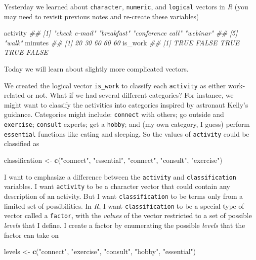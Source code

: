 \documentclass[]{book}
\newenvironment{Shaded}{\begin{snugshade}}{\end{snugshade}}
\newcommand{\CommentTok}[1]{\textcolor[rgb]{0.56,0.35,0.01}{\textit{#1}}}
\newcommand{\KeywordTok}[1]{\textcolor[rgb]{0.13,0.29,0.53}{\textbf{#1}}}
\newcommand{\NormalTok}[1]{#1}
\newcommand{\StringTok}[1]{\textcolor[rgb]{0.31,0.60,0.02}{#1}}
\begin{document}
Yesterday we learned about \texttt{character}, \texttt{numeric}, and \texttt{logical} vectors in \emph{R} (you may need to revisit previous notes and re-create these variables)

\begin{Shaded}
\begin{Highlighting}[]
\NormalTok{activity}
\CommentTok{## [1] "check e-mail"    "breakfast"       "conference call" "webinar"        }
\CommentTok{## [5] "walk"}
\NormalTok{minutes}
\CommentTok{## [1] 20 30 60 60 60}
\NormalTok{is_work}
\CommentTok{## [1]  TRUE FALSE  TRUE  TRUE FALSE}
\end{Highlighting}
\end{Shaded}

Today we will learn about slightly more complicated vectors.

We created the logical vector \texttt{is\_work} to classify each \texttt{activity} as either work-related or not. What if we had several different categories? For instance, we might want to classify the activities into categories inspired by astronaut Kelly's guidance. Categories might include: \texttt{connect} with others; go outside and \texttt{exercise}; \texttt{consult} experts; get a \texttt{hobby}; and (my own category, I guess) perform \texttt{essential} functions like eating and sleeping. So the values of \texttt{activity} could be classified as

\begin{Shaded}
\begin{Highlighting}[]
\NormalTok{classification <-}
\StringTok{    }\KeywordTok{c}\NormalTok{(}\StringTok{"connect"}\NormalTok{, }\StringTok{"essential"}\NormalTok{, }\StringTok{"connect"}\NormalTok{, }\StringTok{"consult"}\NormalTok{, }\StringTok{"exercise"}\NormalTok{)}
\end{Highlighting}
\end{Shaded}

I want to emphasize a difference between the \texttt{activity} and \texttt{classification} variables. I want \texttt{activity} to be a character vector that could contain any description of an activity. But I want \texttt{classification} to be terms only from a limited set of possibilities. In \emph{R}, I want \texttt{classification} to be a special type of vector called a \texttt{factor}, with the \emph{values} of the vector restricted to a set of possible \emph{levels} that I define. I create a factor by enumerating the possible \emph{levels} that the factor can take on

\begin{Shaded}
\begin{Highlighting}[]
\NormalTok{levels <-}\StringTok{ }\KeywordTok{c}\NormalTok{(}\StringTok{"connect"}\NormalTok{, }\StringTok{"exercise"}\NormalTok{, }\StringTok{"consult"}\NormalTok{, }\StringTok{"hobby"}\NormalTok{, }\StringTok{"essential"}\NormalTok{)}
\end{Highlighting}
\end{Shaded}
\end{document}
